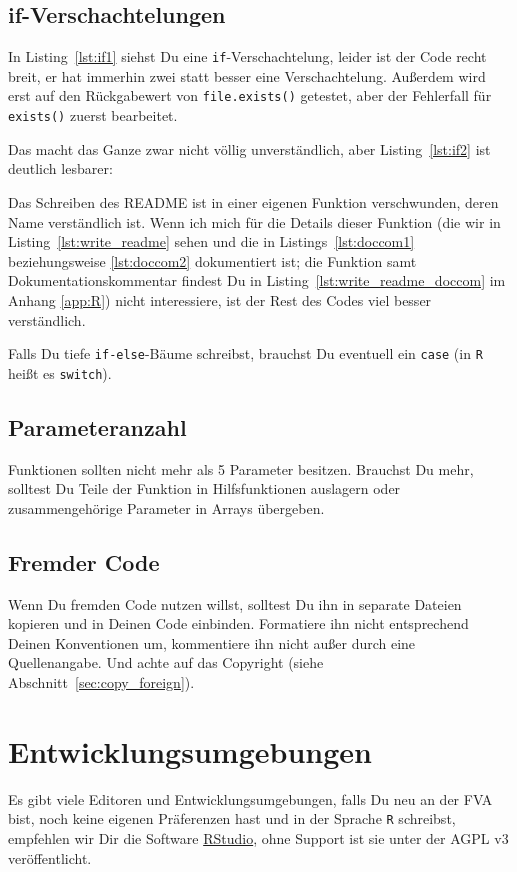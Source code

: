 \documentclass[twoside]{scrreprt}
\providecommand{\R}{\texttt{R}}
\providecommand{\code}[1]{\texttt{#1}}
\begin{document}
\subsection{if-Verschachtelungen\label{sec:if}}
In Listing~\ref{lst:if1} siehst Du eine \code{if}-Verschachtelung, leider ist
der Code recht breit, er hat immerhin zwei statt besser eine Verschachtelung.
Au\ss{}erdem wird erst auf den R\"u{}ckgabewert von
\code{file.exists()} getestet, aber der Fehlerfall f\"u{}r
\code{exists()} zuerst bearbeitet.

Das macht das Ganze zwar nicht v\"o{}llig unverst\"a{}ndlich, aber
Listing~\ref{lst:if2} ist deutlich lesbarer:

Das Schreiben des README ist in
einer eigenen Funktion verschwunden, deren Name verst\"a{}ndlich ist. Wenn ich
mich f\"u{}r die Details dieser Funktion 
(die wir in Listing~\ref{lst:write_readme} sehen und die in
Listings~\ref{lst:doccom1} beziehungsweise \ref{lst:doccom2} dokumentiert ist;
die Funktion samt Dokumentationskommentar findest Du in 
Listing~\ref{lst:write_readme_doccom} 
im Anhang \ref{app:R})
nicht interessiere, ist der Rest des Codes viel besser verst\"a{}ndlich.


Falls Du tiefe \code{if-else}-B\"a{}ume schreibst, brauchst Du eventuell 
ein \code{case} (in \R{} hei\ss{}t es \code{switch}).
\subsection{Parameteranzahl\label{sec:parameteranzahl}} 
Funktionen sollten nicht mehr als 5 Parameter besitzen.
Brauchst Du mehr, solltest Du Teile der Funktion in Hilfsfunktionen auslagern
oder zusammengeh\"o{}rige Parameter in Arrays \"u{}bergeben.

\subsection{Fremder Code} 
Wenn Du fremden Code nutzen willst, solltest Du ihn in separate Dateien kopieren
und in Deinen Code einbinden. 
Formatiere ihn nicht entsprechend Deinen Konventionen um, 
kommentiere ihn nicht au\ss{}er durch eine Quellenangabe. 
Und achte auf das Copyright (siehe Abschnitt~\ref{sec:copy_foreign}).

\section{Entwicklungsumgebungen}
Es gibt viele Editoren und Entwicklungsumgebungen, falls Du neu an der FVA bist,
noch keine
eigenen Pr\"a{}ferenzen hast und in der Sprache \R{} schreibst, empfehlen wir 
Dir die Software \href{http://www.rstudio.com/products/rstudio/}{RStudio}, 
ohne Support ist sie unter der AGPL v3 ver\"o{}ffentlicht.
\end{document}
